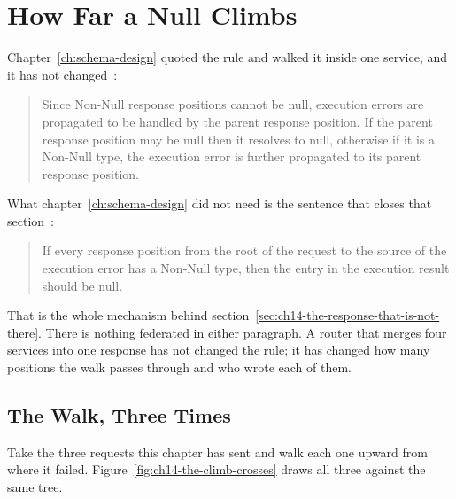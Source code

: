 \section{How Far a Null Climbs}
\label{sec:ch14-how-far-a-null-climbs}

%
Chapter~\ref{ch:schema-design} quoted the rule and walked it inside one
service, and it has not changed~\autocite{graphqlspec2025}:

\begin{quote}
Since Non-Null response positions cannot be null, execution errors are
propagated to be handled by the parent response position. If the parent
response position may be null then it resolves to null, otherwise if it is a
Non-Null type, the execution error is further propagated to its parent
response position.
\end{quote}

%
What chapter~\ref{ch:schema-design} did not need is the sentence that closes
that section~\autocite{graphqlspec2025}:

\begin{quote}
If every response position from the root of the request to the source of the
execution error has a Non-Null type, then the  entry in the
execution result should be null.
\end{quote}

%
That is the whole mechanism behind section~\ref{sec:ch14-the-response-that-is-not-there}.
There is nothing federated in either paragraph. A router that merges four
services into one response has not changed the rule; it has changed how many
positions the walk passes through and who wrote each of them.

\subsection{The Walk, Three Times}

%
Take the three requests this chapter has sent and walk each one upward from
where it failed. Figure~\ref{fig:ch14-the-climb-crosses} draws all three
against the same tree.

